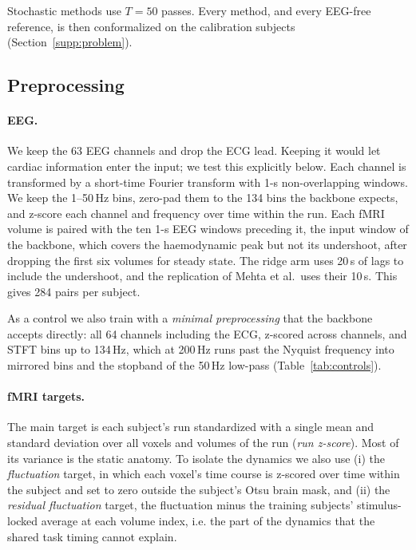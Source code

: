 Stochastic methods use $T=50$ passes. Every method, and every EEG-free reference, is then conformalized on the calibration subjects (Section~\ref{supp:problem}).


\subsection{Preprocessing}\label{supp:setup}
\paragraph{EEG.} We keep the 63 EEG channels and drop the ECG lead. Keeping it would let cardiac information enter the input; we test this explicitly below. Each channel is transformed by a short-time Fourier transform with 1-s non-overlapping windows. We keep the 1--50\,Hz bins, zero-pad them to the 134 bins the backbone expects, and z-score each channel and frequency over time within the run. Each fMRI volume is paired with the ten 1-s EEG windows preceding it, the input window of the backbone, which covers the haemodynamic peak but not its undershoot, after dropping the first six volumes for steady state. The ridge arm uses 20\,s of lags to include the undershoot, and the replication of Mehta et al.\ uses their 10\,s. This gives 284 pairs per subject.

As a control we also train with a \emph{minimal preprocessing} that the backbone accepts directly: all 64 channels including the ECG, z-scored across channels, and STFT bins up to 134\,Hz, which at 200\,Hz runs past the Nyquist frequency into mirrored bins and the stopband of the 50\,Hz low-pass (Table~\ref{tab:controls}).

\paragraph{fMRI targets.} The main target is each subject's run standardized with a single mean and standard deviation over all voxels and volumes of the run (\emph{run z-score}). Most of its variance is the static anatomy. To isolate the dynamics we also use (i) the \emph{fluctuation} target, in which each voxel's time course is z-scored over time within the subject and set to zero outside the subject's Otsu brain mask, and (ii) the \emph{residual fluctuation} target, the fluctuation minus the training subjects' stimulus-locked average at each volume index, i.e. the part of the dynamics that the shared task timing cannot explain.

